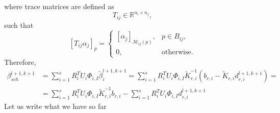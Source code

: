 \documentclass[a4paper, 11pt]{article}
\theoremstyle{plain}
\theoremstyle{definition}
\theoremstyle{remark}
\begin{document}
where trace matrices are defined as
\begin{equation*}
    T_{ij} \in \mathbb{R}^{n_{i} \times n_{j}},
\end{equation*}
such that
\begin{equation*}
    \left[T_{ij}\alpha_{j}\right]_{p} = 
    \begin{cases}
        \left[\alpha_{j}\right]_{\mathcal{M}_{ij}(p)}, & p\in B_{ij},\\
        0, & \text{otherwise}.
    \end{cases}
\end{equation*}
Therefore,
\begin{align*}
    \beta_{sch}^{l+1, k+1} &= \sum_{i = 1}^{s}R_{i}^{T}U_{i}\Phi_{i, I}\tilde{\beta}^{l+1, k + 1}_{i} = \sum_{i = 1}^{s}R_{i}^{T}U_{i}\Phi_{i, I}\tilde{K}_{r, i}^{-1}\left(b_{r, i} - \tilde{K}_{r, i}d^{l+1, k+1}_{r, i}\right) = \\
    &= \sum_{i = 1}^{s}R_{i}^{T}U_{i}\Phi_{i, I}\tilde{K}_{r, i}^{-1}b_{r, i} - \sum_{i = 1}^{s}R_{i}^{T}U_{i}\Phi_{i, I}d^{l+1, k+1}_{r, i}
\end{align*}
Let us write what we have so far
\end{document}
